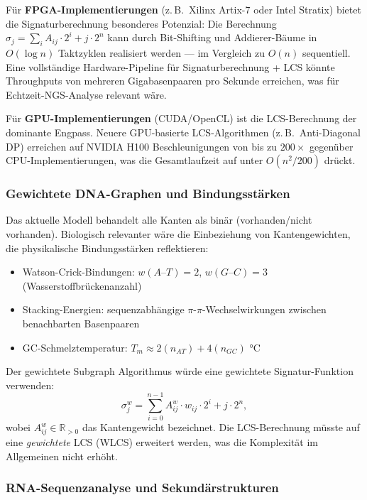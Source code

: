 ﻿\documentclass[a4paper,12pt]{article}
\theoremstyle{definition}
\begin{document}
Für \textbf{FPGA-Implementierungen} (z.\,B.\ Xilinx Artix-7 oder Intel Stratix)
bietet die Signaturberechnung besonderes Potenzial: Die Berechnung
$\sigma_j = \sum_{i} A_{ij} \cdot 2^i + j \cdot 2^n$ kann durch Bit-Shifting
und Addierer-Bäume in $O(\log n)$ Taktzyklen realisiert werden --- im Vergleich
zu $O(n)$ sequentiell. Eine vollständige Hardware-Pipeline für
Signaturberechnung + LCS könnte Throughputs von mehreren Gigabasenpaaren
pro Sekunde erreichen, was für Echtzeit-NGS-Analyse relevant wäre.

Für \textbf{GPU-Implementierungen} (CUDA/OpenCL) ist die LCS-Berechnung
der dominante Engpass. Neuere GPU-basierte LCS-Algorithmen (z.\,B.\ Anti-Diagonal
DP) erreichen auf NVIDIA H100 Beschleunigungen von bis zu $200\times$ gegenüber
CPU-Implementierungen, was die Gesamtlaufzeit auf unter $O(n^2 / 200)$ drückt.

\subsubsection{Gewichtete DNA-Graphen und Bindungsstärken}

Das aktuelle Modell behandelt alle Kanten als binär (vorhanden/nicht vorhanden).
Biologisch relevanter wäre die Einbeziehung von Kantengewichten, die
physikalische Bindungsstärken reflektieren:

\begin{itemize}
	\item Watson-Crick-Bindungen: $w(A \text{--} T) = 2$,
	$w(G \text{--} C) = 3$ (Wasserstoffbrückenanzahl)
	\item Stacking-Energien: sequenzabhängige $\pi$-$\pi$-Wechselwirkungen
	zwischen benachbarten Basenpaaren
	\item GC-Schmelztemperatur: $T_m \approx 2(n_{AT}) + 4(n_{GC})$  °C
\end{itemize}

Der gewichtete Subgraph Algorithmus würde eine gewichtete Signatur-Funktion
verwenden:
\[
\sigma_j^w = \sum_{i=0}^{n-1} A_{ij}^w \cdot w_{ij} \cdot 2^i + j \cdot 2^n,
\]
wobei $A_{ij}^w \in \mathbb{R}_{>0}$ das Kantengewicht bezeichnet.
Die LCS-Berechnung müsste auf eine \textit{gewichtete} LCS (WLCS) erweitert
werden, was die Komplexität im Allgemeinen nicht erhöht.

\subsubsection{RNA-Sequenzanalyse und Sekundärstrukturen}
\end{document}
